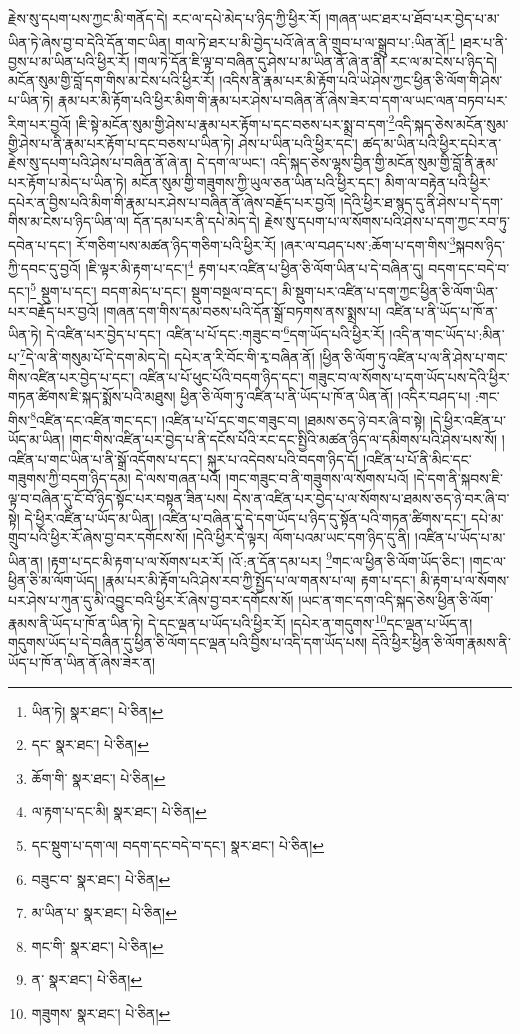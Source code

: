 རྗེས་སུ་དཔག་པས་ཀྱང་མི་གནོད་དེ། རང་ལ་དཔེ་མེད་པ་ཉིད་ཀྱི་ཕྱིར་རོ། །གཞན་ཡང་ཐར་པ་ཐོབ་པར་བྱེད་པ་མ་ཡིན་ཏེ་ཞེས་བྱ་བ་དེའི་དོན་གང་ཡིན། གལ་ཏེ་ཐར་པ་མི་བྱེད་པའོ་ཞེ་ན་ནི་གྲུབ་པ་ལ་སྒྲུབ་པ་:ཡིན་ནོ།\footnote{ཡིན་ཏེ།  སྣར་ཐང་།  པེ་ཅིན། } །ཐར་པ་ནི་བྱས་པ་མ་ཡིན་པའི་ཕྱིར་རོ། །གལ་ཏེ་དོན་ཇི་ལྟ་བ་བཞིན་དུ་ཤེས་པ་མ་ཡིན་ནོ་ཞེ་ན་ནི། རང་ལ་མ་ངེས་པ་ཉིད་དེ། མངོན་སུམ་གྱི་བློ་དག་གིས་མ་ངེས་པའི་ཕྱིར་རོ། །འདིས་ནི་རྣམ་པར་མི་རྟོག་པའི་ཡེ་ཤེས་ཀྱང་ཕྱིན་ཅི་ལོག་གི་ཤེས་པ་ཡིན་ཏེ། རྣམ་པར་མི་རྟོག་པའི་ཕྱིར་མིག་གི་རྣམ་པར་ཤེས་པ་བཞིན་ནོ་ཞེས་ཟེར་བ་དག་ལ་ཡང་ལན་བཏབ་པར་རིག་པར་བྱའོ། །ཇི་སྟེ་མངོན་སུམ་གྱི་ཤེས་པ་རྣམ་པར་རྟོག་པ་དང་བཅས་པར་སྨྲ་བ་དག་\footnote{དང་  སྣར་ཐང་།  པེ་ཅིན། }འདི་སྐད་ཅེས་མངོན་སུམ་གྱི་ཤེས་པ་ནི་རྣམ་པར་རྟོག་པ་དང་བཅས་པ་ཡིན་ཏེ། ཤེས་པ་ཡིན་པའི་ཕྱིར་དང་། ཚད་མ་ཡིན་པའི་ཕྱིར་དཔེར་ན་རྗེས་སུ་དཔག་པའི་ཤེས་པ་བཞིན་ནོ་ཞེ་ན། དེ་དག་ལ་ཡང་། འདི་སྐད་ཅེས་ལྷས་བྱིན་གྱི་མངོན་སུམ་གྱི་བློ་ནི་རྣམ་པར་རྟོག་པ་མེད་པ་ཡིན་ཏེ། མངོན་སུམ་གྱི་གཟུགས་ཀྱི་ཡུལ་ཅན་ཡིན་པའི་ཕྱིར་དང་། མིག་ལ་བརྟེན་པའི་ཕྱིར་དཔེར་ན་བྱིས་པའི་མིག་གི་རྣམ་པར་ཤེས་པ་བཞིན་ནོ་ཞེས་བརྗོད་པར་བྱའོ། །དེའི་ཕྱིར་ཐ་སྙད་དུ་ནི་ཤེས་པ་དེ་དག་གིས་མ་ངེས་པ་ཉིད་ཡིན་ལ། དོན་དམ་པར་ནི་དཔེ་མེད་དེ། རྗེས་སུ་དཔག་པ་ལ་སོགས་པའི་ཤེས་པ་དག་ཀྱང་རབ་ཏུ་དབེན་པ་དང་། རོ་གཅིག་པས་མཚན་ཉིད་གཅིག་པའི་ཕྱིར་རོ། །ཞར་ལ་བཤད་པས་:ཆོག་པ་དག་གིས་\footnote{ཆོག་གི་  སྣར་ཐང་།  པེ་ཅིན། }སྐབས་ཉིད་ཀྱི་དབང་དུ་བྱའོ། །ཇི་ལྟར་མི་རྟག་པ་དང་།\footnote{ལ་རྟག་པ་དང་མི།  སྣར་ཐང་།  པེ་ཅིན། } རྟག་པར་འཛིན་པ་ཕྱིན་ཅི་ལོག་ཡིན་པ་དེ་བཞིན་དུ། བདག་དང་བདེ་བ་དང་།\footnote{དང་སྡུག་པ་དག་ལ། བདག་དང་བདེ་བ་དང་།  སྣར་ཐང་།  པེ་ཅིན། } སྡུག་པ་དང་། བདག་མེད་པ་དང་། སྡུག་བསྔལ་བ་དང་། མི་སྡུག་པར་འཛིན་པ་དག་ཀྱང་ཕྱིན་ཅི་ལོག་ཡིན་པར་བརྗོད་པར་བྱའོ། །གཞན་དག་གིས་དམ་བཅས་པའི་དོན་སྒྲོ་བཏགས་ནས་སྨྲས་པ། འཛིན་པ་ནི་ཡོད་པ་ཁོ་ན་ཡིན་ཏེ། དེ་འཛིན་པར་བྱེད་པ་དང་། འཛིན་པ་པོ་དང་:གཟུང་བ་\footnote{བཟུང་བ་  སྣར་ཐང་།  པེ་ཅིན། }དག་ཡོད་པའི་ཕྱིར་རོ། །འདི་ན་གང་ཡོད་པ་:མིན་པ་\footnote{མ་ཡིན་པ་  སྣར་ཐང་།  པེ་ཅིན། }དེ་ལ་ནི་གསུམ་པོ་དེ་དག་མེད་དེ། དཔེར་ན་རི་བོང་གི་རྭ་བཞིན་ནོ། །ཕྱིན་ཅི་ལོག་ཏུ་འཛིན་པ་ལ་ནི་ཤེས་པ་གང་གིས་འཛིན་པར་བྱེད་པ་དང་། འཛིན་པ་པོ་ཕུང་པོའི་བདག་ཉིད་དང་། གཟུང་བ་ལ་སོགས་པ་དག་ཡོད་པས་དེའི་ཕྱིར་གཏན་ཚིགས་ཇི་སྐད་སྨོས་པའི་མཐུས། ཕྱིན་ཅི་ལོག་ཏུ་འཛིན་པ་ནི་ཡོད་པ་ཁོ་ན་ཡིན་ནོ། །འདིར་བཤད་པ། :གང་གིས་\footnote{གང་གི་  སྣར་ཐང་།  པེ་ཅིན། }འཛིན་དང་འཛིན་གང་དང་། །འཛིན་པ་པོ་དང་གང་གཟུང་བ། །ཐམས་ཅད་ཉེ་བར་ཞི་བ་སྟེ། །དེ་ཕྱིར་འཛིན་པ་ཡོད་མ་ཡིན། །གང་གིས་འཛིན་པར་བྱེད་པ་ནི་དངོས་པོའི་རང་དང་སྤྱིའི་མཚན་ཉིད་ལ་དམིགས་པའི་ཤེས་པས་སོ། །འཛིན་པ་གང་ཡིན་པ་ནི་སྒྲོ་འདོགས་པ་དང་། སྐུར་པ་འདེབས་པའི་བདག་ཉིད་དོ། །འཛིན་པ་པོ་ནི་མིང་དང་གཟུགས་ཀྱི་བདག་ཉིད་དམ། དེ་ལས་གཞན་པའོ། །གང་གཟུང་བ་ནི་གཟུགས་ལ་སོགས་པའོ། །དེ་དག་ནི་སྐབས་ཇི་ལྟ་བ་བཞིན་དུ་ངོ་བོ་ཉིད་སྟོང་པར་བསྟན་ཟིན་པས། དེས་ན་འཛིན་པར་བྱེད་པ་ལ་སོགས་པ་ཐམས་ཅད་ཉེ་བར་ཞི་བ་སྟེ། དེ་ཕྱིར་འཛིན་པ་ཡོད་མ་ཡིན། །འཛིན་པ་བཞིན་དུ་དེ་དག་ཡོད་པ་ཉིད་དུ་སྟོན་པའི་གཏན་ཚིགས་དང་། དཔེ་མ་གྲུབ་པའི་ཕྱིར་རོ་ཞེས་བྱ་བར་དགོངས་སོ། །དེའི་ཕྱིར་དེ་ལྟར། ལོག་པའམ་ཡང་དག་ཉིད་དུ་ནི། །འཛིན་པ་ཡོད་པ་མ་ཡིན་ན། །རྟག་པ་དང་མི་རྟག་པ་ལ་སོགས་པར་རོ། །འོ་:ན་དོན་དམ་པར། \footnote{ན་  སྣར་ཐང་།  པེ་ཅིན། }གང་ལ་ཕྱིན་ཅི་ལོག་ཡོད་ཅིང་། །གང་ལ་ཕྱིན་ཅི་མ་ལོག་ཡོད། །རྣམ་པར་མི་རྟོག་པའི་ཤེས་རབ་ཀྱི་སྤྱོད་པ་ལ་གནས་པ་ལ། རྟག་པ་དང་། མི་རྟག་པ་ལ་སོགས་པར་ཤེས་པ་ཀུན་དུ་མི་འབྱུང་བའི་ཕྱིར་རོ་ཞེས་བྱ་བར་དགོངས་སོ། །ཡང་ན་གང་དག་འདི་སྐད་ཅེས་ཕྱིན་ཅི་ལོག་རྣམས་ནི་ཡོད་པ་ཁོ་ན་ཡིན་ཏེ། དེ་དང་ལྡན་པ་ཡོད་པའི་ཕྱིར་རོ། །དཔེར་ན་གདུགས་\footnote{གཟུགས་  སྣར་ཐང་།  པེ་ཅིན། }དང་ལྡན་པ་ཡོད་ན། གདུགས་ཡོད་པ་དེ་བཞིན་དུ་ཕྱིན་ཅི་ལོག་དང་ལྡན་པའི་བྱིས་པ་འདི་དག་ཡོད་པས། དེའི་ཕྱིར་ཕྱིན་ཅི་ལོག་རྣམས་ནི་ཡོད་པ་ཁོ་ན་ཡིན་ནོ་ཞེས་ཟེར་ན། 